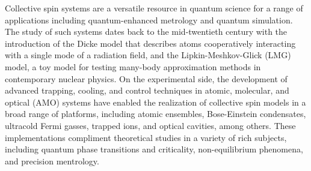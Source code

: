 \documentclass[aps,pra,twocolumn,longbibliography]{revtex4-2}
\newcommand{\1}{\mathds{1}}
\begin{document}
Collective spin systems are a versatile resource in quantum science
for a range of applications including quantum-enhanced metrology and
quantum simulation.  The study of such systems dates back to the
mid-twentieth century with the introduction of the Dicke
model\cite{dicke1954coherence} that describes atoms cooperatively
interacting with a single mode of a radiation field, and the
Lipkin-Meshkov-Glick (LMG) model, a toy model for testing many-body
approximation methods in contemporary nuclear
physics\cite{lipkin1965validity, meshkov1965validity,
  glick1965validity}.  On the experimental side, the development of
advanced trapping, cooling, and control techniques in atomic,
molecular, and optical (AMO) systems have enabled the realization of
collective spin models in a broad range of platforms, including atomic
ensembles\cite{takano2009spin, appel2009mesoscopic,
  schleier-smith2010states, chen2011conditional}, Bose-Einstein
condensates\cite{esteve2008squeezing, riedel2010atomchipbased,
  gross2010nonlinear, klinder2015dynamical}, ultracold Fermi
gasses\cite{martin2013quantum}, trapped ions\cite{bohnet2016quantum},
and optical cavities\cite{leroux2010implementation, bohnet2014reduced,
  cox2016deterministic, hosten2016measurement,
  norcia2018cavitymediated}, among others.  These implementations
compliment theoretical studies in a variety of rich subjects,
including quantum phase transitions and
criticality\cite{latorre2005entanglement, alcalde2007functional,
  wang2012quantum, majd2014lmg}, non-equilibrium
phenomena\cite{walls1978nonequilibrium, morrison2008dynamical,
  morrison2008dissipationdriven, morrison2008collective,
  kessler2012dissipative, bhattacherjee2014nonequilibrium,
  zhiqiang2017nonequilibrium, lang2018concurrence}, and precision
mentrology\cite{wineland1992spin, kitagawa1993squeezed,
  zhong2010simplified, schleier-smith2010squeezing, ma2011quantum,
  huang2015twoaxis, muessel2015twistandturn, huang2015quantum,
  mirkhalaf2018robustifying, lewis-swan2018robust, he2019engineering}.
\end{document}
